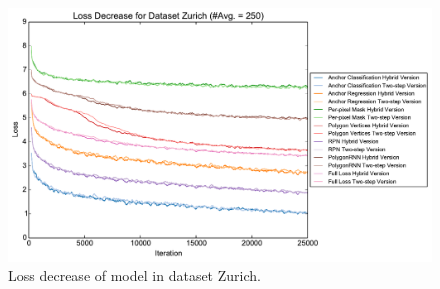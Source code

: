 \begin{figure}[!h]
	\centering
	\includegraphics[width=\fig\textwidth]{4-07.pdf}
    \caption[Loss decrease of model in dataset Zurich]{Loss decrease of model in dataset Zurich.}
	\label{fig:losdeczh}
\end{figure}